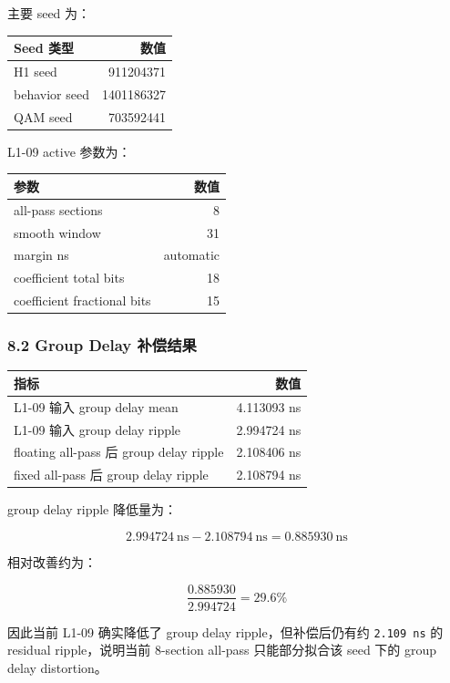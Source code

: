 \documentclass[
]{ctexart}
\begin{document}
主要 seed 为：

\begin{longtable}[]{@{}lr@{}}
\toprule\noalign{}
Seed 类型 & 数值 \\
\midrule\noalign{}
\endhead
\bottomrule\noalign{}
\endlastfoot
H1 seed & 911204371 \\
behavior seed & 1401186327 \\
QAM seed & 703592441 \\
\end{longtable}

L1-09 active 参数为：

\begin{longtable}[]{@{}lr@{}}
\toprule\noalign{}
参数 & 数值 \\
\midrule\noalign{}
\endhead
\bottomrule\noalign{}
\endlastfoot
all-pass sections & 8 \\
smooth window & 31 \\
margin ns & automatic \\
coefficient total bits & 18 \\
coefficient fractional bits & 15 \\
\end{longtable}

\subsubsection{8.2 Group Delay
补偿结果}\label{group-delay-ux8865ux507fux7ed3ux679c}

\begin{longtable}[]{@{}lr@{}}
\toprule\noalign{}
指标 & 数值 \\
\midrule\noalign{}
\endhead
\bottomrule\noalign{}
\endlastfoot
L1-09 输入 group delay mean & 4.113093 ns \\
L1-09 输入 group delay ripple & 2.994724 ns \\
floating all-pass 后 group delay ripple & 2.108406 ns \\
fixed all-pass 后 group delay ripple & 2.108794 ns \\
\end{longtable}

group delay ripple 降低量为：

\[
2.994724\ \mathrm{ns}-2.108794\ \mathrm{ns}=0.885930\ \mathrm{ns}
\]

相对改善约为：

\[
\frac{0.885930}{2.994724}=29.6\%
\]

因此当前 L1-09 确实降低了 group delay ripple，但补偿后仍有约
\texttt{2.109\ ns} 的 residual ripple，说明当前 8-section all-pass
只能部分拟合该 seed 下的 group delay distortion。
\end{document}
